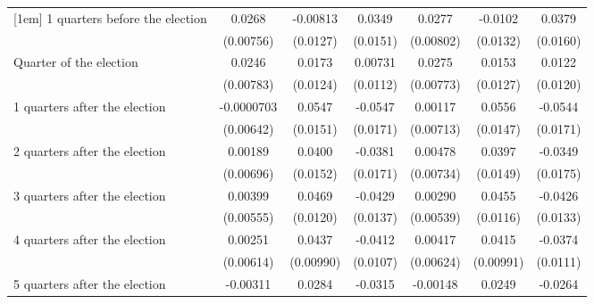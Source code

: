 \begin{table}[htbp]
\begin{tabular}{l*{6}{c}}
[1em]
 1 quarters before the election&      0.0268\sym{***}&    -0.00813         &      0.0349\sym{*}  &      0.0277\sym{***}&     -0.0102         &      0.0379\sym{*}  \\
                    &   (0.00756)         &    (0.0127)         &    (0.0151)         &   (0.00802)         &    (0.0132)         &    (0.0160)         \\
[1em]
Quarter of the election&      0.0246\sym{**} &      0.0173         &     0.00731         &      0.0275\sym{***}&      0.0153         &      0.0122         \\
                    &   (0.00783)         &    (0.0124)         &    (0.0112)         &   (0.00773)         &    (0.0127)         &    (0.0120)         \\
[1em]
 1 quarters after the election&  -0.0000703         &      0.0547\sym{***}&     -0.0547\sym{**} &     0.00117         &      0.0556\sym{***}&     -0.0544\sym{**} \\
                    &   (0.00642)         &    (0.0151)         &    (0.0171)         &   (0.00713)         &    (0.0147)         &    (0.0171)         \\
[1em]
 2 quarters after the election&     0.00189         &      0.0400\sym{**} &     -0.0381\sym{*}  &     0.00478         &      0.0397\sym{**} &     -0.0349\sym{*}  \\
                    &   (0.00696)         &    (0.0152)         &    (0.0171)         &   (0.00734)         &    (0.0149)         &    (0.0175)         \\
[1em]
 3 quarters after the election&     0.00399         &      0.0469\sym{***}&     -0.0429\sym{**} &     0.00290         &      0.0455\sym{***}&     -0.0426\sym{**} \\
                    &   (0.00555)         &    (0.0120)         &    (0.0137)         &   (0.00539)         &    (0.0116)         &    (0.0133)         \\
[1em]
 4 quarters after the election&     0.00251         &      0.0437\sym{***}&     -0.0412\sym{***}&     0.00417         &      0.0415\sym{***}&     -0.0374\sym{***}\\
                    &   (0.00614)         &   (0.00990)         &    (0.0107)         &   (0.00624)         &   (0.00991)         &    (0.0111)         \\
[1em]
 5 quarters after the election&    -0.00311         &      0.0284\sym{**} &     -0.0315\sym{**} &    -0.00148         &      0.0249\sym{*}  &     -0.0264\sym{*}  \\

\end{tabular}
\end{table}

